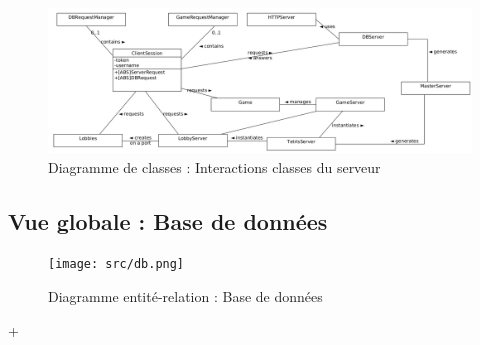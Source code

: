 \documentclass{report}
\begin{document}
\vspace{-1em}

\begin{figure}[H]
    \centering
    \includegraphics[width=\textwidth, keepaspectratio]{src/server_class.png}
    \caption{Diagramme de classes : Interactions classes du serveur}
    \label{fig:classes_server}
\end{figure}

\subsection{Vue globale : Base de données}

\vspace{-1em}

\begin{figure}[H]
    \centering
    \texttt{[image: src/db.png]}
    \caption{Diagramme entité-relation : Base de données}
    \label{fig:entity_relation_database}
\end{figure}
+
\end{document}
